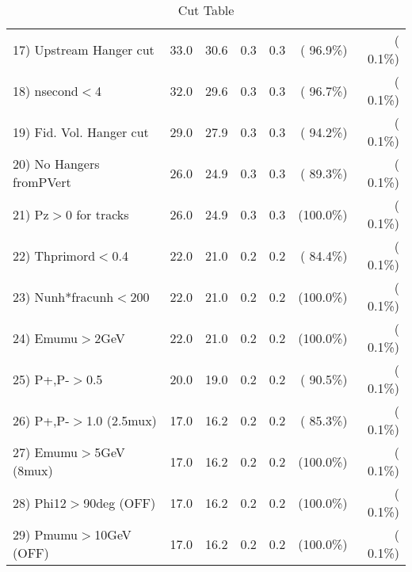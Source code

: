 \begin{table}[h!]
\begin{tabular}{||l||r|r|r|r|r|r||}
 17) Upstream Hanger cut  &         33.0 &         30.6 &          0.3 &          0.3 & ( 96.9\%) & (  0.1\%) \\
 18) nsecond$<$4          &         32.0 &         29.6 &          0.3 &          0.3 & ( 96.7\%) & (  0.1\%) \\
 19) Fid. Vol. Hanger cut &         29.0 &         27.9 &          0.3 &          0.3 & ( 94.2\%) & (  0.1\%) \\
 20) No Hangers fromPVert &         26.0 &         24.9 &          0.3 &          0.3 & ( 89.3\%) & (  0.1\%) \\
 21) Pz$>$0 for tracks    &         26.0 &         24.9 &          0.3 &          0.3 & (100.0\%) & (  0.1\%) \\
 22) Thprimord$<$0.4      &         22.0 &         21.0 &          0.2 &          0.2 & ( 84.4\%) & (  0.1\%) \\
 23) Nunh*fracunh$<$200   &         22.0 &         21.0 &          0.2 &          0.2 & (100.0\%) & (  0.1\%) \\
 24) Emumu$>$2GeV         &         22.0 &         21.0 &          0.2 &          0.2 & (100.0\%) & (  0.1\%) \\
 25) P+,P-$>$0.5          &         20.0 &         19.0 &          0.2 &          0.2 & ( 90.5\%) & (  0.1\%) \\
 26) P+,P-$>$1.0 (2.5mux) &         17.0 &         16.2 &          0.2 &          0.2 & ( 85.3\%) & (  0.1\%) \\
 27) Emumu$>$5GeV  (8mux) &         17.0 &         16.2 &          0.2 &          0.2 & (100.0\%) & (  0.1\%) \\
 28) Phi12$>$90deg  (OFF) &         17.0 &         16.2 &          0.2 &          0.2 & (100.0\%) & (  0.1\%) \\
 29) Pmumu$>$10GeV  (OFF) &         17.0 &         16.2 &          0.2 &          0.2 & (100.0\%) & (  0.1\%) \\
 \hline
 \hline
 \end{tabular}
 \caption{Cut Table           }
 \label{tab-cutcohjpsi-mumu_anuecc}
 \end{table}
